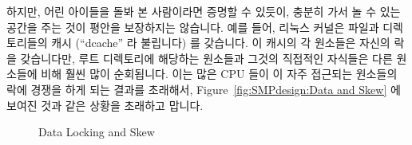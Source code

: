 하지만, 어린 아이들을 돌봐 본 사람이라면 증명할 수 있듯이, 충분히 가서 놀 수
있는 공간을 주는 것이 평안을 보장하지는 않습니다.
예를 들어, 리눅스 커널은 파일과 디렉토리들의 캐시 (``dcache'' 라 불립니다) 를
갖습니다.
이 캐시의 각 원소들은 자신의 락을 갖습니다만, 루트 디렉토리에 해당하는 원소들과
그것의 직접적인 자식들은 다른 원소들에 비해 훨씬 많이 순회됩니다.
이는 많은 CPU 들이 이 자주 접근되는 원소들의 락에 경쟁을 하게 되는 결과를
초래해서, Figure~\ref{fig:SMPdesign:Data and Skew} 에 보여진 것과 같은 상황을
초래하고 맙니다.

\begin{figure}[htb]
\begin{center}
\end{center}
\caption{Data Locking and Skew}
\end{figure}

